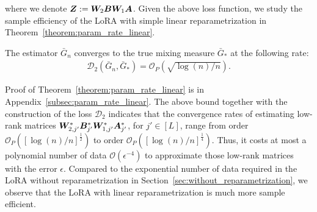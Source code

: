 where we denote ${\bm Z}:=\bm{W}_2{\bm B}\bm{W}_1{\bm A}$. Given the above loss function, we study the sample efficiency of the LoRA with simple linear reparametrization in Theorem~\ref{theorem:param_rate_linear}.
\begin{theorem}    \label{theorem:param_rate_linear}
    The estimator $\bar{G}_n$ converges to the true mixing measure $\bar{G}_*$ at the following rate:
    \begin{align*}    \mathcal{D}_2(\bar{G}_n,\bar{G}_*)=\mathcal{O}_{P}(\sqrt{\log(n)/n}).
    \end{align*}
\end{theorem}
Proof of Theorem~\ref{theorem:param_rate_linear} is in Appendix~\ref{subsec:param_rate_linear}. The above bound together with the construction of the loss $\mathcal{D}_{2}$ indicates that the convergence rates of estimating low-rank matrices $\bm{W}^*_{2,j'}{\bm B}^*_{j'}\bm{W}^*_{1,j'}{\bm A}^*_{j'}$, for $j'\in[L]$, range from order $\mathcal{O}_P([\log(n)/n]^{\frac{1}{2}})$ to order $\mathcal{O}_P([\log(n)/n]^{\frac{1}{4}})$. Thus, it costs at most a polynomial number of data $\mathcal{O}(\epsilon^{-4})$ to approximate those low-rank matrices with the error $\epsilon$. Compared to the exponential number of data required in the LoRA without reparametrization in Section~\ref{sec:without_reparametrization}, we observe that the LoRA with linear reparametrization is much more sample efficient.



